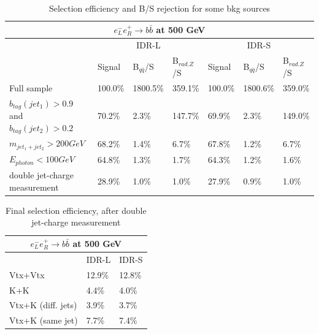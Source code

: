 \documentclass[preprint]{elsarticle}
\begin{document}
\begin{table}[t]
  \begin{center}\renewcommand{\arraystretch}{1.6}
    \begin{tabular}{l|l|l|l|l|l|l} 
    \multicolumn{7}{c}{$e_{L}^{-}e_{R}^{+}\rightarrow b\bar{b}$ at 500 GeV }\\
      \hline
      \hline
       & \multicolumn{3}{c|}{IDR-L} & \multicolumn{3}{|c}{IDR-S}\\
       & Signal& B$_{q\bar{q}}$/S & B$_{rad. Z}$/S & Signal & B$_{q\bar{q}}$/S & B$_{rad. Z}$/S\\
      \hline
      Full sample   & 100.0\% & 1800.5\% & 359.1\% & 100.0\% & 1800.6\% & 359.0\% \\
      $b_{tag}(jet_{1})>0.9$ and $b_{tag}(jet_{2})>0.2$    & 70.2\% & 2.3\% & 147.7\%  & 69.9\% & 2.3\% & 149.0\% \\
      $m_{jet_{1}+jet_{2}}>200 GeV$    & 68.2\% & 1.4\% & 6.7\%  & 67.8\% & 1.2\% & 6.7\% \\
      $E_{photon}<100 GeV$    & 64.8\% & 1.3\% & 1.7\% & 64.3\% & 1.2\% & 1.6\% \\
      double jet-charge measurement    & 28.9\% & 1.0\% & 1.0\% & 27.9\% & 0.9\% & 1.0\% \\
      \hline
      \hline     
    \end{tabular}
 \end{center}
 \caption{Selection efficiency and B/S rejection for some bkg sources}
\label{table_eff_bbbar}
\end{table}


\begin{table}[t]
  \begin{center}\renewcommand{\arraystretch}{1.6}
    \begin{tabular}{l|l|l} 
    \multicolumn{3}{c}{$e_{L}^{-}e_{R}^{+}\rightarrow b\bar{b}$ at 500 GeV }\\
      \hline
      \hline
       & IDR-L & IDR-S\\
      \hline
      Vtx+Vtx   & 12.9\% & 12.8\% \\
      K+K    & 4.4\% & 4.0\% \\
      Vtx+K (diff. jets)    & 3.9\% & 3.7\% \\
      Vtx+K (same jet) & 7.7\% & 7.4\% \\
      \hline
      \hline     
    \end{tabular}
 \end{center}
 \caption{Final selection efficiency, after double jet-charge measurement}
 \label{table_charge_calc_bbbar}
\end{table}
    
\end{document}
